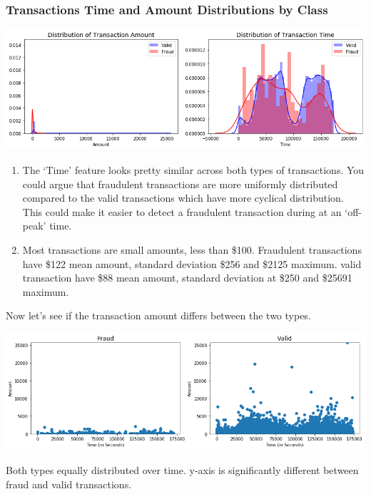 \documentclass[20pt,a4paper]{article}
\begin{document}
        \subsubsection{Transactions Time and Amount Distributions by Class}
            \begin{center}
            \includegraphics[scale=0.45]{graphs/output_22_0.png}
            \end{center}
            
            \begin{enumerate}[label=\roman*)]
            \item
              The `Time' feature looks pretty similar across both types of
              transactions. You could argue that fraudulent transactions are more
              uniformly distributed compared to the valid transactions which have more cyclical
              distribution. This could make it easier to detect a fraudulent
              transaction during at an `off-peak' time.
            \item
              Most transactions are small amounts, less than \$100. Fraudulent
              transactions have \$122 mean amount, standard deviation \$256 and \$2125 maximum. valid transaction have \$88 mean amount, standard deviation at \$250 and \$25691 maximum.
            \end{enumerate}
        Now let's see if the transaction amount differs between the two types.

    \begin{center}
    \includegraphics[scale=0.45]{graphs/output_24_0.png}
    \end{center}
    Both types equally distributed over time. y-axis is significantly different
    between fraud and valid transactions.
\end{document}
